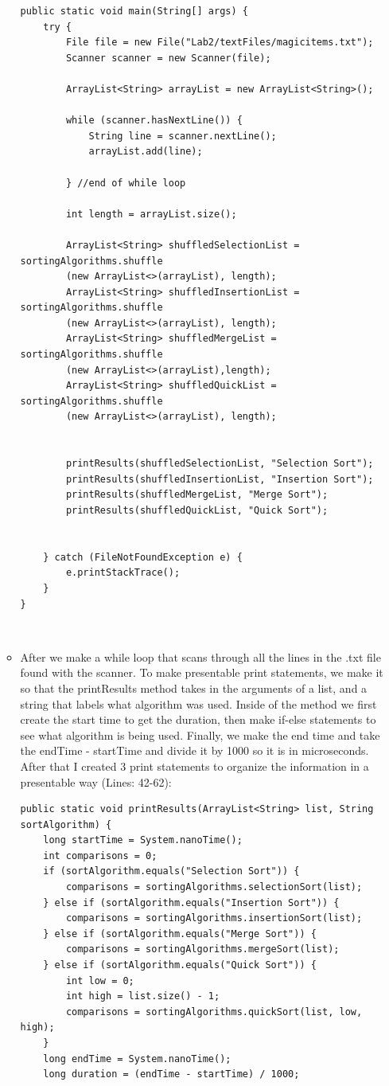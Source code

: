 \documentclass[a4paper,12pt]{article}
\begin{document}
\begin{itemize}
\begin{itemize}
\begin{verbatim}
public static void main(String[] args) {
    try {
        File file = new File("Lab2/textFiles/magicitems.txt");
        Scanner scanner = new Scanner(file);

        ArrayList<String> arrayList = new ArrayList<String>();

        while (scanner.hasNextLine()) {
            String line = scanner.nextLine();
            arrayList.add(line);

        } //end of while loop

        int length = arrayList.size();

        ArrayList<String> shuffledSelectionList = sortingAlgorithms.shuffle
        (new ArrayList<>(arrayList), length);
        ArrayList<String> shuffledInsertionList = sortingAlgorithms.shuffle
        (new ArrayList<>(arrayList), length);
        ArrayList<String> shuffledMergeList = sortingAlgorithms.shuffle
        (new ArrayList<>(arrayList),length);
        ArrayList<String> shuffledQuickList = sortingAlgorithms.shuffle
        (new ArrayList<>(arrayList), length);

    
        printResults(shuffledSelectionList, "Selection Sort");
        printResults(shuffledInsertionList, "Insertion Sort");
        printResults(shuffledMergeList, "Merge Sort");
        printResults(shuffledQuickList, "Quick Sort");
        
    
    } catch (FileNotFoundException e) {
        e.printStackTrace();
    }
}

\end{verbatim}\\


\item After we make a while loop that scans through all the lines in the .txt file found with the scanner. To make presentable print statements, we make it so that the printResults method takes in the arguments of a list, and a string that labels what algorithm was used. Inside of the method we first create the start time to get the duration, then make if-else statements to see what algorithm is being used. Finally, we make the end time and take the endTime - startTime and divide it by 1000 so it is in microseconds. After that I created 3 print statements to organize the information in a presentable way  (Lines: 42-62):
\begin{verbatim}
public static void printResults(ArrayList<String> list, String sortAlgorithm) {
    long startTime = System.nanoTime();
    int comparisons = 0;
    if (sortAlgorithm.equals("Selection Sort")) {
        comparisons = sortingAlgorithms.selectionSort(list);
    } else if (sortAlgorithm.equals("Insertion Sort")) {
        comparisons = sortingAlgorithms.insertionSort(list);
    } else if (sortAlgorithm.equals("Merge Sort")) {
        comparisons = sortingAlgorithms.mergeSort(list);
    } else if (sortAlgorithm.equals("Quick Sort")) {
        int low = 0;
        int high = list.size() - 1;
        comparisons = sortingAlgorithms.quickSort(list, low, high);
    }
    long endTime = System.nanoTime();
    long duration = (endTime - startTime) / 1000;


\end{verbatim}
\end{itemize}
\end{itemize}
\end{document}
